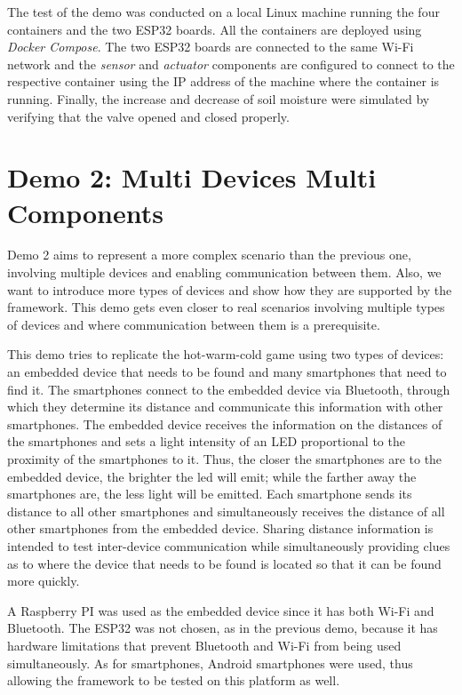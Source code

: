 The test of the demo was conducted on a local Linux machine running the four containers and the two ESP32 boards. All the containers are deployed
using \emph{Docker Compose}.
The two ESP32 boards are connected to the same Wi-Fi network and the \emph{sensor} and \emph{actuator} components are configured to connect to the
respective container using the IP address of the machine where the container is running.
Finally, the increase and decrease of soil moisture were simulated by verifying that the valve opened and closed properly.

\section{Demo 2: Multi Devices Multi Components}
\label{sec:demo-2}

Demo 2 aims to represent a more complex scenario than the previous one, involving multiple devices and enabling communication between them.
Also, we want to introduce more types of devices and show how they are supported by the framework.
This demo gets even closer to real scenarios involving multiple types of devices and where communication between them is a prerequisite.

This demo tries to replicate the hot-warm-cold game using two types of devices: an embedded device that needs to be found and many smartphones that
need to find it. The smartphones connect to the embedded device via Bluetooth, through which they determine its distance and communicate
this information with other smartphones. The embedded device receives the information on the distances of the smartphones and sets a light intensity
of an LED proportional to the proximity of the smartphones to it. Thus, the closer the smartphones are to the embedded device, the brighter the led
will emit; while the farther away the smartphones are, the less light will be emitted.
Each smartphone sends its distance to all other smartphones and simultaneously receives the distance of all other smartphones from the embedded
device. Sharing distance information is intended to test inter-device communication while simultaneously providing clues as to where the device that
needs to be found is located so that it can be found more quickly.

A Raspberry PI was used as the embedded device since it has both Wi-Fi and Bluetooth. The ESP32 was not chosen, as in the previous demo, because it
has hardware limitations that prevent Bluetooth and Wi-Fi from being used simultaneously. As for smartphones, Android smartphones were used, thus
allowing the framework to be tested on this platform as well.

